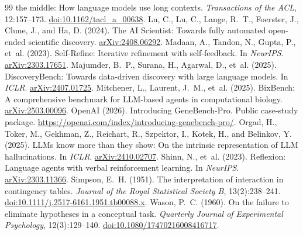 \documentclass[10pt]{article}
\begin{document}
\begin{thebibliography}{99}
the middle: How language models use long contexts. \emph{Transactions of the ACL}, 12:157--173.
\href{https://doi.org/10.1162/tacl_a_00638}{doi:10.1162/tacl\_a\_00638}.
 Lu, C., Lu, C., Lange, R.~T., Foerster, J., Clune, J., and Ha, D. (2024). The AI Scientist: Towards
fully automated open-ended scientific discovery. \href{https://arxiv.org/abs/2408.06292}{arXiv:2408.06292}.
 Madaan, A., Tandon, N., Gupta, P., et~al. (2023). Self-Refine: Iterative refinement with
self-feedback. In \emph{NeurIPS}. \href{https://arxiv.org/abs/2303.17651}{arXiv:2303.17651}.
 Majumder, B.~P., Surana, H., Agarwal, D., et~al. (2025). DiscoveryBench: Towards
data-driven discovery with large language models. In \emph{ICLR}. \href{https://arxiv.org/abs/2407.01725}{arXiv:2407.01725}.
 Mitchener, L., Laurent, J.~M., et~al. (2025). BixBench: A comprehensive benchmark for
LLM-based agents in computational biology. \href{https://arxiv.org/abs/2503.00096}{arXiv:2503.00096}.
 OpenAI (2026). Introducing GeneBench-Pro. Public case-study package.
\url{https://openai.com/index/introducing-genebench-pro/}.
 Orgad, H., Toker, M., Gekhman, Z., Reichart, R., Szpektor, I., Kotek, H., and Belinkov, Y. (2025).
LLMs know more than they show: On the intrinsic representation of LLM hallucinations. In \emph{ICLR}.
\href{https://arxiv.org/abs/2410.02707}{arXiv:2410.02707}.
 Shinn, N., et~al. (2023). Reflexion: Language agents with verbal reinforcement learning. In
\emph{NeurIPS}. \href{https://arxiv.org/abs/2303.11366}{arXiv:2303.11366}.
 Simpson, E.~H. (1951). The interpretation of interaction in contingency tables. \emph{Journal of the Royal
Statistical Society B}, 13(2):238--241. \href{https://doi.org/10.1111/j.2517-6161.1951.tb00088.x}{doi:10.1111/j.2517-6161.1951.tb00088.x}.
 Wason, P.~C. (1960). On the failure to eliminate hypotheses in a conceptual task. \emph{Quarterly Journal of
Experimental Psychology}, 12(3):129--140. \href{https://doi.org/10.1080/17470216008416717}{doi:10.1080/17470216008416717}.
\end{thebibliography}

\clearpage
\appendix
\renewcommand{\thetable}{A\arabic{table}}
\renewcommand{\thefigure}{A\arabic{figure}}
\setcounter{table}{0}
\setcounter{figure}{0}
\end{document}
